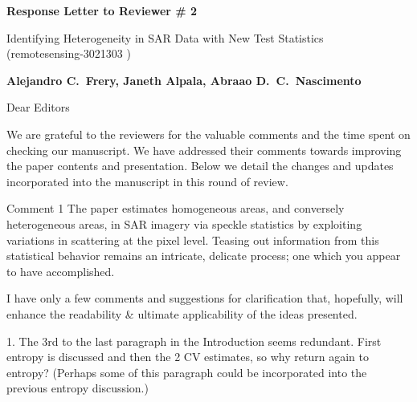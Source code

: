 \documentclass[11pt]{report}
\begin{document}
\begin{center}
\large{\textbf{Response Letter to Reviewer \# 2}}

\vglue 0.3cm

\huge{ Identifying Heterogeneity in SAR Data with New Test Statistics\\ (remotesensing-3021303 )}
\end{center}

\begin{center}
\textbf{Alejandro C.\ Frery, Janeth Alpala, Abraao D.\ C.\ Nascimento }
\end{center}

\date{\today}



\vspace{2cm}
\noindent Dear Editors
\bigskip

\noindent We are grateful to the reviewers for the valuable comments and the time spent on checking our manuscript. 
We have addressed their comments towards improving the paper contents and presentation. 
Below we detail the changes and updates incorporated into the manuscript in this round of review.

\medskip


\begin{reviewbox}{Comment 1}
The paper estimates homogeneous areas, and conversely heterogeneous areas, in SAR imagery via speckle statistics by exploiting variations in scattering at the pixel level. Teasing out information from this statistical behavior remains an intricate, delicate process; one which you appear to have accomplished. 

I have only a few comments and suggestions for clarification that, hopefully, will enhance the readability \& ultimate applicability of the ideas presented.

1. The 3rd to the last paragraph in the Introduction seems redundant. First entropy is discussed and then the 2 CV estimates, so why return again to entropy? (Perhaps some of this paragraph could be incorporated into the previous entropy discussion.)
\end{reviewbox}
\end{document}
